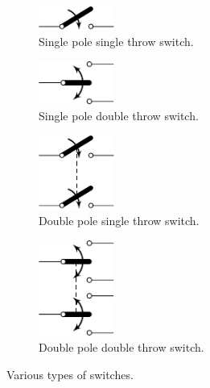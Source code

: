 \documentclass[a4paper]{report}
\begin{document}
\begin{figure}[H]
    \centering
    \begin{subfigure}{0.47\linewidth}
        \centering
        \includegraphics[width=2.5cm]{figures/spst.pdf}
        \caption{Single pole single throw switch.}
    \end{subfigure}
    \begin{subfigure}{0.47\linewidth}
        \centering
        \includegraphics[width=2.5cm]{figures/spdt.pdf}
        \caption{Single pole double throw switch.}
    \end{subfigure}

    \vspace*{5ex}
    \begin{subfigure}{0.47\linewidth}
        \centering
        \includegraphics[width=2.5cm]{figures/dpst.pdf}
        \caption{Double pole single throw switch.}
    \end{subfigure}
    \begin{subfigure}{0.47\linewidth}
        \centering
        \includegraphics[width=2.5cm]{figures/dpdt.pdf}
        \caption{Double pole double throw switch.}
    \end{subfigure}
    \caption{Various types of switches.}
\end{figure}
\end{document}
